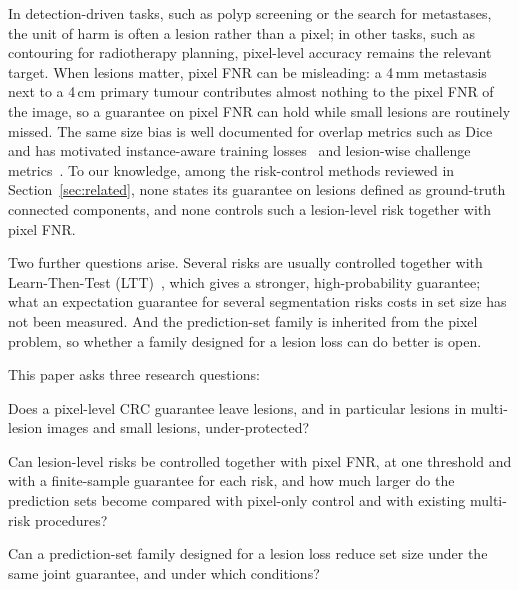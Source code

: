 \documentclass[sn-mathphys-num]{sn-jnl}%
\theoremstyle{thmstyleone}
\theoremstyle{thmstyletwo}
\theoremstyle{thmstylethree}
\newcommand{\1}{\mathbb{1}}
\begin{document}
In detection-driven tasks, such as polyp screening or the search for metastases, the unit of harm is often a lesion rather than a pixel; in other tasks, such as contouring for radiotherapy planning, pixel-level accuracy remains the relevant target. When lesions matter, pixel FNR can be misleading: a 4\,mm metastasis next to a 4\,cm primary tumour contributes almost nothing to the pixel FNR of the image, so a guarantee on pixel FNR can hold while small lesions are routinely missed. The same size bias is well documented for overlap metrics such as Dice~\cite{maierhein2024metrics,reinke2024pitfalls,jaus2025ccmetrics} and has motivated instance-aware training losses~\cite{kofler2023blob,bouteille2025closer} and lesion-wise challenge metrics~\cite{moawad2023bratsmets}. To our knowledge, among the risk-control methods reviewed in Section~\ref{sec:related}, none states its guarantee on lesions defined as ground-truth connected components, and none controls such a lesion-level risk together with pixel FNR.

Two further questions arise. Several risks are usually controlled together with Learn-Then-Test (LTT)~\cite{angelopoulos2025ltt,laufer2023pareto}, which gives a stronger, high-probability guarantee; what an expectation guarantee for several segmentation risks costs in set size has not been measured. And the prediction-set family is inherited from the pixel problem, so whether a family designed for a lesion loss can do better is open.

This paper asks three research questions:
\begin{description}[leftmargin=2.2em,style=sameline]
\item[RQ1] Does a pixel-level CRC guarantee leave lesions, and in particular lesions in multi-lesion images and small lesions, under-protected?
\item[RQ2] Can lesion-level risks be controlled together with pixel FNR, at one threshold and with a finite-sample guarantee for each risk, and how much larger do the prediction sets become compared with pixel-only control and with existing multi-risk procedures?
\item[RQ3] Can a prediction-set family designed for a lesion loss reduce set size under the same joint guarantee, and under which conditions?
\end{description}
\end{document}
